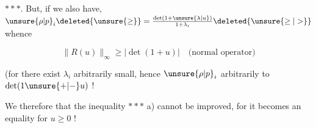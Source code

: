  $***$. But, if  we also have,   $\unsure{\rho|p}_i\deleted{\unsure{\geq}}=\frac{\det(1+\unsure{\lambda|u})}{1+\lambda_i}\deleted{\unsure{\geq|>}}$ whence

\[
\boxed{\|R(u)\|_\infty\geq|\det(1+u)|}\quad\text{(normal operator)}
\]

(for there exist $\lambda_i$ arbitrarily small, hence $\unsure{\rho|p}_i$ arbitrarily  to $\det(1\unsure{+|-}u)$ !

We   therefore that the inequality $***$ a) cannot be improved, for it becomes an equality for $u\geq0$ !
